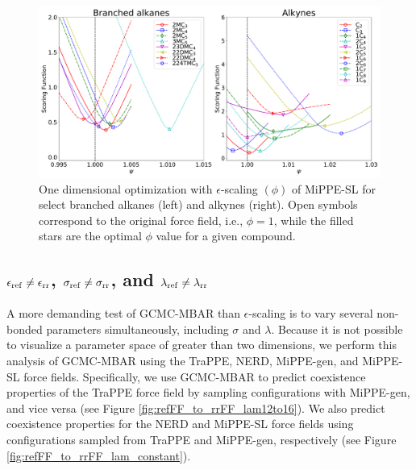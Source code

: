 \documentclass[journal=jced,manuscript=article]{achemso}
\begin{document}
	\begin{figure}[htb!]
		\centering
		\includegraphics[width=6.4in]{Optimal_epsilon_scaling.pdf}
		\caption{One dimensional optimization with $\epsilon$-scaling $(\phi)$ of MiPPE-SL for select branched alkanes (left) and alkynes (right). Open symbols correspond to the original force field, i.e., $\phi = 1$, while the filled stars are the optimal $\phi$ value for a given compound.}
		\label{fig:epsilon_scaling}
	\end{figure}

 

\subsection{$\epsilon_{\rm ref} \neq \epsilon_{\rm rr}$, $\sigma_{\rm ref} \neq \sigma_{\rm rr}$, and $\lambda_{\rm ref} \neq \lambda_{\rm rr}$}

A more demanding test of GCMC-MBAR than $\epsilon$-scaling is to vary several non-bonded parameters simultaneously, including $\sigma$ and $\lambda$. Because it is not possible to visualize a parameter space of greater than two dimensions, we perform this analysis of GCMC-MBAR using the TraPPE, NERD, MiPPE-gen, and MiPPE-SL force fields. Specifically, we use GCMC-MBAR to predict coexistence properties of the TraPPE force field by sampling configurations with MiPPE-gen, and vice versa (see Figure \ref{fig:refFF_to_rrFF_lam12to16}). We also predict coexistence properties for the NERD and MiPPE-SL force fields using configurations sampled from TraPPE and MiPPE-gen, respectively (see Figure \ref{fig:refFF_to_rrFF_lam_constant}).
\end{document}
